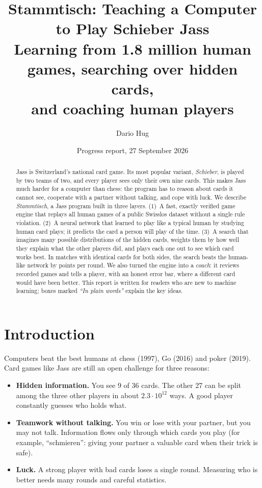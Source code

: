 \documentclass[10pt,a4paper]{article}
\title{\textbf{Stammtisch: Teaching a Computer to Play Schieber Jass}\\[4pt]
\large Learning from 1.8 million human games, searching over hidden cards,\\ and coaching human players}
\author{Dario Hug}
\date{Progress report, 27 September 2026}
\begin{document}
\maketitle

\begin{abstract}
\noindent
Jass is Switzerland's national card game. Its most popular variant, \emph{Schieber}, is played by two teams of two, and
every player sees only their own nine cards. This makes Jass much harder for a computer than chess: the program has
to reason about cards it cannot see, cooperate with a partner without talking, and cope with luck.
We describe \emph{Stammtisch}, a Jass program built in three layers.
(1)~A fast, exactly verified game engine that replays all \NGames{} human games of a public Swisslos dataset without a
single rule violation.
(2)~A neural network that learned to play like a typical human by studying \NCards{} human card plays; it predicts the
card a person will play \CardAcc{} of the time.
(3)~A search that imagines many possible distributions of the hidden cards, weights them by how well they explain what
the other players did, and plays each one out to see which card works best.
In matches with identical cards for both sides, the search beats the human-like network by \SearchVsNet{} points per
round. We also turned the engine into a \emph{coach}: it reviews recorded games and tells a player, with an honest error
bar, where a different card would have been better.
This report is written for readers who are new to machine learning; boxes marked \emph{``In plain words''} explain
the key ideas.
\end{abstract}

\section{Introduction}

Computers beat the best humans at chess (1997), Go (2016) and poker (2019). Card games like Jass are still an open
challenge for three reasons:
\begin{itemize}
\item \textbf{Hidden information.} You see 9 of 36 cards. The other 27 can be split among the three other players in
  about $2.3\cdot10^{12}$ ways. A good player constantly guesses who holds what.
\item \textbf{Teamwork without talking.} You win or lose with your partner, but you may not talk. Information flows
  only through which cards you play (for example, ``schmieren'': giving your partner a valuable card when their trick is safe).
\item \textbf{Luck.} A strong player with bad cards loses a single round. Measuring who is better needs many rounds and
  careful statistics.
\end{itemize}
\end{document}
